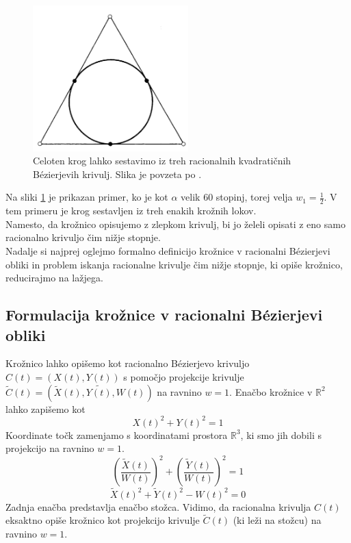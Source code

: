 \documentclass[a4paper,11pt]{article}
\theoremstyle{definition}
\theoremstyle{plain}
\begin{document}
\begin{figure}[ht!]\label{slika:krogpodelih}
    \centering
    \includegraphics[width=60mm]{krog_po_delih.png}
    \caption{Celoten krog lahko sestavimo iz treh racionalnih kvadratičnih B\'ezierjevih krivulj. Slika je povzeta po \cite{farin}.}
\end{figure}
\noindent
Na sliki \ref{slika:krogpodelih} je prikazan primer, ko je kot $\alpha$ velik 60 stopinj, torej velja $w_1 = \frac{1}{2}$. V tem primeru je krog sestavljen iz treh enakih krožnih lokov.
\\

Namesto, da krožnico opisujemo z zlepkom krivulj, bi jo želeli opisati z eno samo racionalno krivuljo čim nižje stopnje.
\\
Nadalje si najprej oglejmo formalno definicijo krožnice v racionalni B\'ezierjevi obliki in problem iskanja racionalne krivulje čim nižje stopnje, ki opiše krožnico, reducirajmo na lažjega.

\subsection{Formulacija krožnice v racionalni B\'ezierjevi obliki}
Krožnico lahko opišemo kot racionalno B\'ezierjevo krivuljo $C(t)=(X(t),Y(t))$ s pomočjo projekcije krivulje $\tilde{C}(t)=(\tilde{X}(t), \tilde{Y(t)}, W(t))$ na ravnino $w=1$. 
Enačbo krožnice v $\mathbb{R}^2$ lahko zapišemo kot
$$X(t)^2+Y(t)^2=1$$
Koordinate točk zamenjamo s koordinatami prostora $\mathbb{R}^3$, ki smo jih dobili s projekcijo na ravnino $w=1$.
$$\left(\frac{\tilde{X}(t)}{W(t)}\right)^2+\left(\frac{\tilde{Y}(t)}{W(t)}\right)^2=1$$
$$\tilde{X}(t)^2+\tilde{Y}(t)^2-W(t)^2=0$$
Zadnja enačba predstavlja enačbo stožca. Vidimo, da racionalna krivulja $C(t)$ eksaktno opiše krožnico kot projekcijo krivulje $\tilde{C}(t)$ (ki leži na stožcu) na ravnino $w = 1$.
\end{document}
